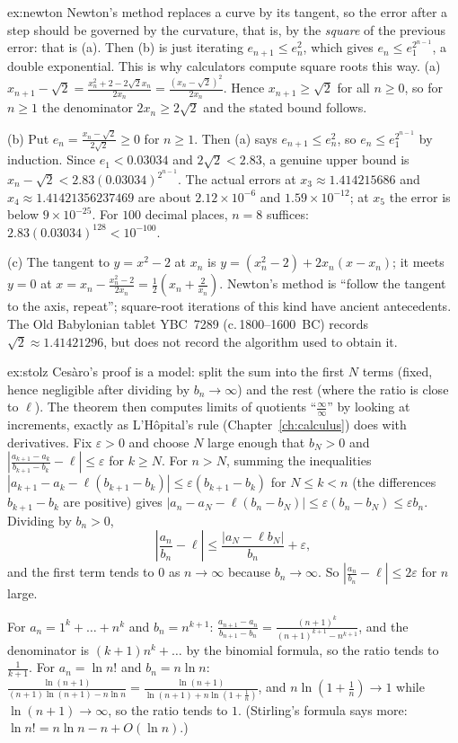 \begin{solution}{ex:newton}
\idea Newton's method replaces a curve by its tangent, so the error after a step should be governed by the curvature, that is, by the \emph{square} of the previous error: that is (a). Then (b) is just iterating $e_{n+1}\le e_n^2$, which gives $e_n\le e_1^{2^{n-1}}$, a double exponential. This is why calculators compute square roots this way.
\writeup (a) $x_{n+1}-\sqrt2=\frac{x_n^2+2-2\sqrt2x_n}{2x_n}=\frac{(x_n-\sqrt2)^2}{2x_n}$. Hence $x_{n+1}\ge\sqrt2$ for all $n\ge0$, so for $n\ge1$ the denominator $2x_n\ge2\sqrt2$ and the stated bound follows.

(b) Put $e_n=\frac{x_n-\sqrt2}{2\sqrt2}\ge0$ for $n\ge1$. Then (a) says $e_{n+1}\le e_n^2$, so $e_n\le e_1^{2^{n-1}}$ by induction.
Since $e_1<0.03034$ and $2\sqrt2<2.83$, a genuine upper bound is
$x_n-\sqrt2<2.83(0.03034)^{2^{n-1}}$.
The actual errors at $x_3\approx1.414215686$ and $x_4\approx1.41421356237469$ are about $2.12\times10^{-6}$ and $1.59\times10^{-12}$; at $x_5$ the error is below $9\times10^{-25}$.
For $100$ decimal places, $n=8$ suffices: $2.83(0.03034)^{128}<10^{-100}$.

(c) The tangent to $y=x^2-2$ at $x_n$ is $y=(x_n^2-2)+2x_n(x-x_n)$; it meets $y=0$ at $x=x_n-\frac{x_n^2-2}{2x_n}=\frac12\left(x_n+\frac2{x_n}\right)$. Newton's method is ``follow the tangent to the axis, repeat''; square-root iterations of this kind have ancient antecedents. The Old Babylonian tablet YBC~7289 (c.\,1800--1600~BC) records $\sqrt2\approx1.41421296$, but does not record the algorithm used to obtain it.
\end{solution}

\begin{solution}{ex:stolz}
\idea Ces\`aro's proof is a model: split the sum into the first $N$ terms (fixed, hence negligible after dividing by $b_n\to\infty$) and the rest (where the ratio is close to $\ell$). The theorem then computes limits of quotients ``$\frac\infty\infty$'' by looking at increments, exactly as L'H\^opital's rule (Chapter~\ref{ch:calculus}) does with derivatives.
\writeup Fix $\varepsilon>0$ and choose $N$ large enough that $b_N>0$ and $\left|\frac{a_{k+1}-a_k}{b_{k+1}-b_k}-\ell\right|\le\varepsilon$ for $k\ge N$. For $n>N$, summing the inequalities $|a_{k+1}-a_k-\ell(b_{k+1}-b_k)|\le\varepsilon(b_{k+1}-b_k)$ for $N\le k<n$ (the differences $b_{k+1}-b_k$ are positive) gives
$|a_n-a_N-\ell(b_n-b_N)|\le\varepsilon(b_n-b_N)\le\varepsilon b_n$. Dividing by $b_n>0$,
\[
\left|\frac{a_n}{b_n}-\ell\right|\le\frac{|a_N-\ell b_N|}{b_n}+\varepsilon,
\]
and the first term tends to $0$ as $n\to\infty$ because $b_n\to\infty$. So $\left|\frac{a_n}{b_n}-\ell\right|\le2\varepsilon$ for $n$ large.

For $a_n=1^k+\dots+n^k$ and $b_n=n^{k+1}$: $\frac{a_{n+1}-a_n}{b_{n+1}-b_n}=\frac{(n+1)^k}{(n+1)^{k+1}-n^{k+1}}$, and the denominator is $(k+1)n^k+\dots$ by the binomial formula, so the ratio tends to $\frac1{k+1}$.
For $a_n=\ln n!$ and $b_n=n\ln n$: $\frac{\ln(n+1)}{(n+1)\ln(n+1)-n\ln n}=\frac{\ln(n+1)}{\ln(n+1)+n\ln(1+\frac1n)}$, and $n\ln(1+\frac1n)\to1$ while $\ln(n+1)\to\infty$, so the ratio tends to $1$. (Stirling's formula says more: $\ln n!=n\ln n-n+O(\ln n)$.)
\end{solution}

